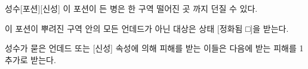 \documentclass{report}
\begin{document}
	\begin{story}{성수}{[포션][신성]}
		이 포션이 든 병은 한 구역 떨어진 곳 까지 던질 수 있다.
		
		이 포션이 뿌려진 구역 안의 모든 언데드가 아닌 대상은 상태 [정화됨 □]을 받는다.
		
		성수가 묻은 언데드 또는 [신성] 속성에 의해 피해를 받는 이들은 다음에 받는 피해를 1 추가로 받는다.
		
	\end{story}
\end{document}
